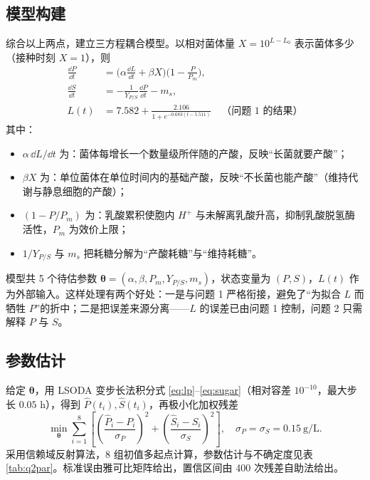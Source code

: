 \subsection{模型构建}
综合以上两点，建立三方程耦合模型。以相对菌体量 $X=10^{L-L_0}$ 表示菌体多少（接种时刻 $X=1$），则
\begin{align}
\frac{\dd P}{\dd t}&=\Big(\alpha\frac{\dd L}{\dd t}+\beta X\Big)\Big(1-\frac{P}{P_m}\Big), \label{eq:lp}\\
\frac{\dd S}{\dd t}&=-\frac{1}{Y_{P/S}}\frac{\dd P}{\dd t}-m_s, \label{eq:sugar}\\
L(t)&=7.582+\frac{2.106}{1+e^{-0.683(t-5.511)}} \quad\text{（问题 1 的结果）} \label{eq:linput}
\end{align}
其中：
\begin{itemize}[leftmargin=2em,itemsep=0.08em]
\item $\alpha\,\dd L/\dd t$ 为：菌体每增长一个数量级所伴随的产酸，反映“长菌就要产酸”；
\item $\beta X$ 为：单位菌体在单位时间内的基础产酸，反映“不长菌也能产酸”（维持代谢与静息细胞的产酸）；
\item $(1-P/P_m)$ 为：乳酸累积使胞内 $H^+$ 与未解离乳酸升高，抑制乳酸脱氢酶活性，$P_m$ 为效价上限；
\item $1/Y_{P/S}$ 与 $m_s$ 把耗糖分解为“产酸耗糖”与“维持耗糖”。
\end{itemize}

\noindent 模型共 5 个待估参数 $\boldsymbol\theta=(\alpha,\beta,P_m,Y_{P/S},m_s)$，状态变量为 $(P,S)$，$L(t)$ 作为外部输入。这样处理有两个好处：一是与问题 1 严格衔接，避免了“为拟合 $L$ 而牺牲 $P$”的折中；二是把误差来源分离——$L$ 的误差已由问题 1 控制，问题 2 只需解释 $P$ 与 $S$。

\subsection{参数估计}
给定 $\boldsymbol\theta$，用 LSODA 变步长法积分式 \eqref{eq:lp}--\eqref{eq:sugar}（相对容差 $10^{-10}$，最大步长 $0.05$ h），得到 $\hat P(t_i),\hat S(t_i)$，再极小化加权残差
$$\min_{\boldsymbol\theta}\sum_{i=1}^{8}\left[\left(\frac{\hat P_i-P_i}{\sigma_P}\right)^2+\left(\frac{\hat S_i-S_i}{\sigma_S}\right)^2\right],\quad \sigma_P=\sigma_S=0.15\ \mathrm{g/L}.$$
采用信赖域反射算法，8 组初值多起点计算，参数估计与不确定度见表 \ref{tab:q2par}。标准误由雅可比矩阵给出，置信区间由 400 次残差自助法给出。

